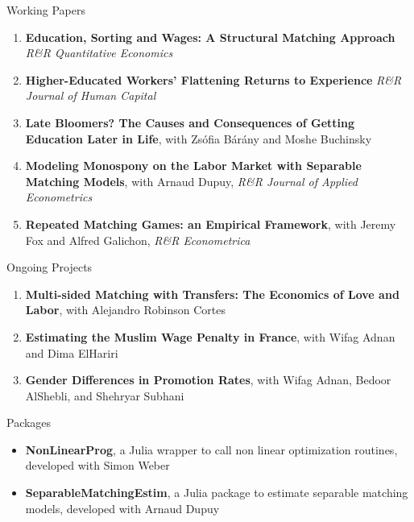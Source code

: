 \documentclass{resume} %
\begin{document}
\begin{rSection}{Working Papers}

  \begin{enumerate}
    \item {\bf Education, Sorting and Wages: A Structural Matching Approach} \textit{R\&R Quantitative Economics}
    \item {\bf Higher-Educated Workers’ Flattening Returns to Experience} \textit{R\&R Journal of Human Capital}
    \item {\bf Late Bloomers? The Causes and Consequences of Getting Education Later in Life}, with Zsófia Bárány and Moshe Buchinsky
    \item {\bf Modeling Monospony on the Labor Market with Separable Matching Models}, with Arnaud Dupuy, \textit{R\&R Journal of Applied Econometrics}
    \item {\bf Repeated Matching Games: an Empirical Framework}, with Jeremy Fox and Alfred Galichon, \textit{R\&R Econometrica}
  \end{enumerate}
  
\end{rSection}

\begin{rSection}{Ongoing Projects}

\begin{enumerate}
  \item {\bf Multi-sided Matching with Transfers: The Economics of Love and Labor}, with Alejandro Robinson Cortes
  \item {\bf Estimating the Muslim Wage Penalty in France}, with Wifag Adnan and Dima ElHariri
  \item {\bf Gender Differences in Promotion Rates}, with Wifag Adnan, Bedoor AlShebli, and Shehryar Subhani
\end{enumerate}

\end{rSection}

\begin{rSection}{Packages}

\begin{itemize}
  \item {\bf NonLinearProg}, a Julia wrapper to call non linear optimization routines, developed with Simon Weber
  \item {\bf SeparableMatchingEstim}, a Julia package to estimate separable matching models, developed with Arnaud Dupuy
\end{itemize}

\end{rSection}
\end{document}
